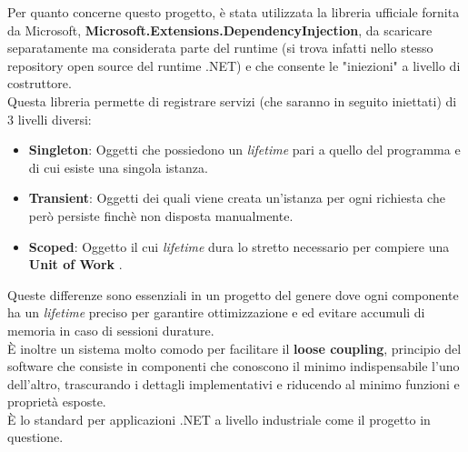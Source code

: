 \documentclass[\main/Tesi.tex]{subfiles}
\begin{document}
Per quanto concerne questo progetto, è stata utilizzata la libreria ufficiale fornita da Microsoft, \textbf{Microsoft.Extensions.DependencyInjection}, da scaricare separatamente ma considerata parte del runtime (si trova infatti nello stesso repository open source del runtime .NET) e che consente le "iniezioni" a livello di costruttore.\\
Questa libreria permette di registrare servizi (che saranno in seguito iniettati) di 3 livelli diversi:
\begin{itemize}
    \item \textbf{Singleton}: Oggetti che possiedono un \textit{lifetime} pari a quello del programma e di cui esiste una singola istanza.
    \item \textbf{Transient}: Oggetti dei quali viene creata un'istanza per ogni richiesta che però persiste finchè non disposta manualmente.
    \item \textbf{Scoped}: Oggetto il cui \textit{lifetime} dura lo stretto necessario per compiere una \textbf{Unit of Work} \cite{uow}.
\end{itemize}
Queste differenze sono essenziali in un progetto del genere dove ogni componente ha un \textit{lifetime} preciso per garantire ottimizzazione e ed evitare accumuli di memoria in caso di sessioni durature.\\
È inoltre un sistema molto comodo per facilitare il \textbf{loose coupling}, principio del software che consiste in componenti che conoscono il minimo indispensabile l'uno dell'altro, trascurando i dettagli implementativi e riducendo al minimo funzioni e proprietà esposte.\\
È lo standard per applicazioni .NET a livello industriale come il progetto in questione. 
\end{document}
